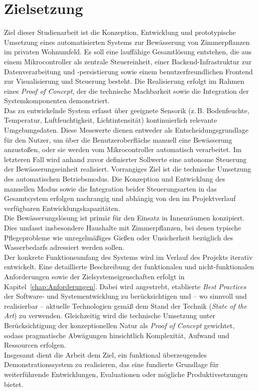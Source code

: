 \section{Zielsetzung}
\label{sec:Zielsetzung}

Ziel dieser Studienarbeit ist die Konzeption, Entwicklung und prototypische Umsetzung eines automatisierten Systems zur Bewässerung von Zimmerpflanzen im privaten Wohnumfeld. Es soll eine lauffähige Gesamtlösung entstehen, die aus einem Mikrocontroller als zentrale Steuereinheit, einer Backend-Infrastruktur zur Datenverarbeitung und -persistierung sowie einem benutzerfreundlichen Frontend zur Visualisierung und Steuerung besteht. Die Realisierung erfolgt im Rahmen eines \textit{Proof of Concept}, der die technische Machbarkeit sowie die Integration der Systemkomponenten demonstriert.
\\
Das zu entwickelnde System erfasst über geeignete Sensorik (z.\,B. Bodenfeuchte, Temperatur, Luftfeuchtigkeit, Lichtintensität) kontinuierlich relevante Umgebungsdaten. Diese Messwerte dienen entweder als Entscheidungsgrundlage für den Nutzer, um über die Benutzeroberfläche manuell eine Bewässerung anzustoßen, oder sie werden vom Mikrocontroller automatisch verarbeitet. Im letzteren Fall wird anhand zuvor definierter Sollwerte eine autonome Steuerung der Bewässerungseinheit realisiert. Vorrangiges Ziel ist die technische Umsetzung des automatischen Betriebsmodus. Die Konzeption und Entwicklung des manuellen Modus sowie die Integration beider Steuerungsarten in das Gesamtsystem erfolgen nachrangig und abhängig von den im Projektverlauf verfügbaren Entwicklungskapazitäten.
\\
Die Bewässerungslösung ist primär für den Einsatz in Innenräumen konzipiert. Dies umfasst insbesondere Haushalte mit Zimmerpflanzen, bei denen typische Pflegeprobleme wie unregelmäßiges Gießen oder Unsicherheit bezüglich des Wasserbedarfs adressiert werden sollen.
\\
Der konkrete Funktionsumfang des Systems wird im Verlauf des Projekts iterativ entwickelt. Eine detaillierte Beschreibung der funktionalen und nicht-funktionalen Anforderungen sowie der Zielsystemeigenschaften erfolgt in Kapitel~\ref{chap:Anforderungen}. Dabei wird angestrebt, etablierte \textit{Best Practices} der Software- und Systementwicklung zu berücksichtigen und – wo sinnvoll und realisierbar – aktuelle Technologien gemäß dem Stand der Technik (\textit{State of the Art}) zu verwenden. Gleichzeitig wird die technische Umsetzung unter Berücksichtigung der konzeptionellen Natur als \textit{Proof of Concept} gewichtet, sodass pragmatische Abwägungen hinsichtlich Komplexität, Aufwand und Ressourcen erfolgen.
\\
Insgesamt dient die Arbeit dem Ziel, ein funktional überzeugendes Demonstrationssystem zu realisieren, das eine fundierte Grundlage für weiterführende Entwicklungen, Evaluationen oder mögliche Produktivsetzungen bietet.
